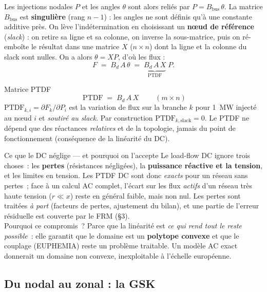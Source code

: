 \documentclass[11pt,a4paper]{article}
\begin{document}
Les injections nodales $P$ et les angles $\theta$ sont alors reliés par
$P = B_{\mathrm{bus}}\,\theta$. La matrice $B_{\mathrm{bus}}$ est
\textbf{singulière} (rang $n-1$) : les angles ne sont définis qu'à une
constante additive près. On lève l'indétermination en choisissant un
\textbf{n\oe{}ud de référence} (\emph{slack}) : on retire sa ligne et sa
colonne, on inverse la sous-matrice, puis on ré-emboîte le résultat dans
une matrice $X$ ($n\times n$) dont la ligne et la colonne du slack sont
nulles. On a alors $\theta = X P$, d'où les flux :
\[
  F \;=\; B_d\, A\, \theta \;=\; \underbrace{B_d\, A\, X}_{\displaystyle \mathrm{PTDF}}\; P .
\]

\begin{defbox}{Matrice PTDF}
\[
  \boxed{\;\mathrm{PTDF} \;=\; B_d\, A\, X\;}\qquad (m\times n)
\]
$\mathrm{PTDF}_{k,i} = \partial F_k/\partial P_i$ est la variation de flux
sur la branche $k$ pour 1~MW injecté au n\oe{}ud $i$ et \emph{soutiré au
slack}. Par construction $\mathrm{PTDF}_{k,\text{slack}} = 0$. Le PTDF ne
dépend que des réactances \emph{relatives} et de la topologie, jamais du
point de fonctionnement (conséquence de la linéarité du DC).
\end{defbox}

\begin{rembox}{Ce que le DC néglige — et pourquoi on l'accepte}
Le load-flow DC ignore trois choses~: les \textbf{pertes} (résistances
négligées), la \textbf{puissance réactive et la tension}, et les limites en
tension. Les PTDF DC sont donc \emph{exacts} pour un réseau sans pertes~; face
à un calcul AC complet, l'écart sur les flux \emph{actifs} d'un réseau très
haute tension ($r\ll x$) reste en général faible, mais non nul. Les pertes
sont traitées \emph{à part} (facteurs de pertes, ajustement du bilan), et une
partie de l'erreur résiduelle est couverte par le FRM (\S3).\\[3pt]
Pourquoi ce compromis~? Parce que la linéarité est \emph{ce qui rend tout le
reste possible}~: elle garantit que le domaine est un \textbf{polytope
convexe} et que le couplage (EUPHEMIA) reste un problème traitable. Un modèle
AC exact donnerait un domaine non convexe, inexploitable à l'échelle
européenne.
\end{rembox}

\subsection{Du nodal au zonal : la GSK}
\label{sec:gsk}
\end{document}
